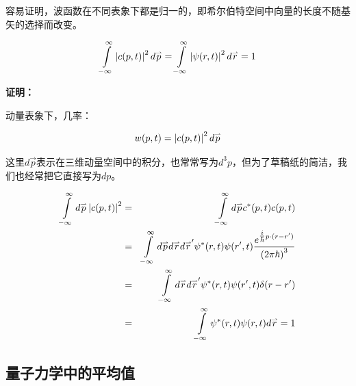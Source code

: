 容易证明，波函数在不同表象下都是归一的，即希尔伯特空间中向量的长度不随基矢的选择而改变。

\begin{equation}
\int\limits_{ - \infty }^\infty  {\left| {c(p,t)} \right|^2 d\mathord{\buildrel{\lower3pt\hbox{$\scriptscriptstyle\rightharpoonup$}}
\over p} }  = \int\limits_{ - \infty }^\infty  {\left| {\psi (r,t)} \right|^2 d\mathord{\buildrel{\lower3pt\hbox{$\scriptscriptstyle\rightharpoonup$}}
\over r} }  = 1
\end{equation}

\textbf{证明：}

动量表象下，几率：

\begin{equation}
w(p,t) = \left| {c(p,t)} \right|^2 d\mathord{\buildrel{\lower3pt\hbox{$\scriptscriptstyle\rightharpoonup$}}
\over p} 
\end{equation}

这里$d \vec p$表示在三维动量空间中的积分，也常常写为$d^3 p$，但为了草稿纸的简洁，我们也经常把它直接写为$d p$。

\begin{eqnarray*}
\int\limits_{ - \infty }^\infty  d\mathord{\buildrel{\lower3pt\hbox{$\scriptscriptstyle\rightharpoonup$}} \over p}  \left| {c(p,t)} \right|^2   & = & \int\limits_{ - \infty }^\infty   d\mathord{\buildrel{\lower3pt\hbox{$\scriptscriptstyle\rightharpoonup$}}
\over p}  {  c^* (p,t)c(p,t) }   \\
{} & = & \int\limits_{ - \infty }^\infty  {d\mathord{\buildrel{\lower3pt\hbox{$\scriptscriptstyle\rightharpoonup$}}
\over p} d\mathord{\buildrel{\lower3pt\hbox{$\scriptscriptstyle\rightharpoonup$}}
\over r} d\mathord{\buildrel{\lower3pt\hbox{$\scriptscriptstyle\rightharpoonup$}}
\over r'} \psi ^* (r,t)\psi (r',t)\frac{{e^{{\textstyle{i \over \hbar }}p \cdot (r - r')} }}{{\left( {2\pi \hbar } \right)^3 }}}  \\
{} & = & \int\limits_{ - \infty }^\infty  {d\mathord{\buildrel{\lower3pt\hbox{$\scriptscriptstyle\rightharpoonup$}}
\over r} d\mathord{\buildrel{\lower3pt\hbox{$\scriptscriptstyle\rightharpoonup$}}
\over r'} \psi ^* (r,t)\psi (r',t)\delta (r - r')} \\
{} & = & \int\limits_{ - \infty }^\infty  {\psi ^* (r,t)\psi (r,t)d\mathord{\buildrel{\lower3pt\hbox{$\scriptscriptstyle\rightharpoonup$}}
\over r} }  =  1
\end{eqnarray*}

\subsection{量子力学中的平均值}

